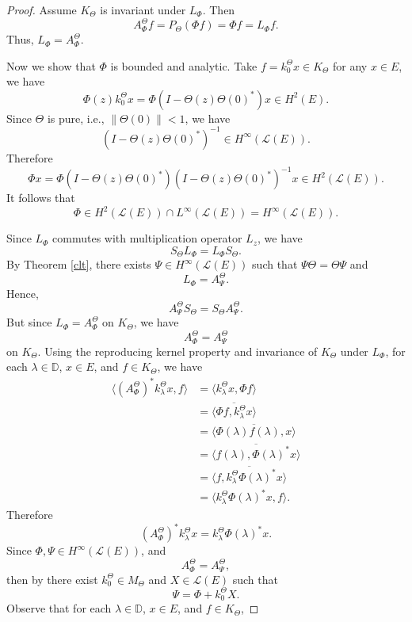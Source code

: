 \documentclass{amsart}
\theoremstyle{definition}
\newcommand{\oL }{\mathcal{L}(E) }
\def\nn{\nonumber}
\begin{document}
\begin{proof}
Assume $K_{\Theta}$ is invariant under $L_{\Phi}$. Then
$$A_{\Phi}^{\Theta}f=P_{\Theta}(\Phi f)=\Phi f=L_{\Phi}f.$$
Thus, $L_{\Phi}=A_{\Phi}^{\Theta}$.

Now we show that $\Phi$ is bounded and analytic. Take $f=k_{0}^{\Theta}x\in K_{\Theta}$ for any $x\in E$, we have 
$$\Phi(z)k_{0}^{\Theta}x=\Phi (I-\Theta(z)\Theta(0)^{*})x\in H^2(E).$$ Since $\Theta$ is pure, i.e., $\|\Theta(0)\|<1$, we have
$$(I-\Theta(z)\Theta(0)^{*})^{-1}\in H^{\infty}(\oL).$$ Therefore
$$\Phi x=\Phi (I-\Theta(z)\Theta(0)^{*})(I-\Theta(z)\Theta(0)^{*})^{-1}x\in H^2(\oL).$$ It follows that 
$$\Phi\in H^2(\oL)\cap L^{\infty}(\oL)=H^{\infty}(\oL).$$

Since $L_{\Phi}$ commutes with multiplication operator $L_{z}$, we have 
$$S_{\Theta}L_{\Phi}=L_{\Phi}S_{\Theta}.$$
By Theorem \ref{clt}, there exists $\Psi\in H^{\infty}(\mathcal{L}(E))$ such that $\Psi\Theta=\Theta \Psi$ and 
$$L_{\Phi}=A_{\Psi}^{\Theta}.$$
Hence,
$$A_{\Psi}^{\Theta}S_{\Theta}=S_{\Theta}A_{\Psi}^{\Theta}.$$
But since $L_{\Phi}=A_{\Phi}^{\Theta}$ on $K_{\Theta}$, we have 
\begin{equation}\label{MTTOEQ}
A_{\Phi}^{\Theta}=A_{\Psi}^{\Theta} 
\end{equation}
on $K_{\Theta}$.
Using the reproducing kernel property and invariance of $K_{\Theta}$ under $L_{\Phi}$, for each $\lambda\in \mathbb{D}$, $x\in E$, and $f\in K_\Theta$, we have 
\begin{align}
\langle (A_{\Phi}^{\Theta})^{*}k_{\lambda}^{\Theta}x, f\rangle
&=\langle k_{\lambda}^{\Theta}x, \Phi f\rangle\nn\\
&=\overline{\langle  \Phi f, k_{\lambda}^{\Theta}x\rangle}\nn\\
&=\overline{\langle  \Phi(\lambda) f(\lambda), x\rangle}\nn\\
&=\overline{\langle   f(\lambda), \Phi(\lambda)^{*} x\rangle}\nn\\
&=\overline{\langle   f, k_{\lambda}^{\Theta}\Phi(\lambda)^{*} x\rangle}\nn\\
&=\langle k_{\lambda}^{\Theta}\Phi(\lambda)^{*} x, f\rangle.\label{F1}
\end{align}
Therefore
$$(A_{\Phi}^{\Theta})^{*}k_{\lambda}^{\Theta}x= k_{\lambda}^{\Theta}\Phi(\lambda)^{*} x.$$
Since $\Phi,\Psi\in H^{\infty}(\oL)$, and  $$A_{\Phi}^{\Theta}=A_{\Psi}^{\Theta},$$ then by \cite[Corollary 6.4]{RT} there exist $k_{0}^{\Theta}\in M_{\Theta}$ and $X\in \oL$ such that 
$$\Psi=\Phi+k_{0}^{\Theta}X.$$
Observe that for each $\lambda\in \mathbb{D}$, $x\in E$, and $f\in K_{\Theta}$, 

\end{proof}
\end{document}
